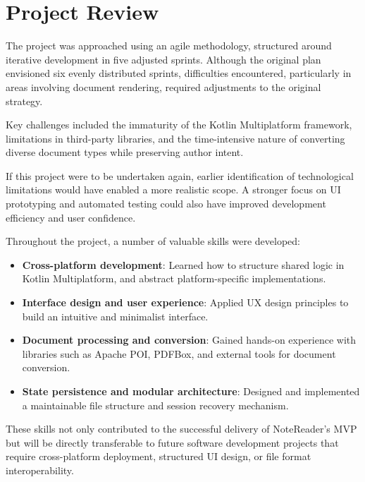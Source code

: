 \section{Project Review}

The project was approached using an agile methodology, structured around iterative development in five adjusted sprints. Although the original plan envisioned six evenly distributed sprints, difficulties encountered, particularly in areas involving document rendering, required adjustments to the original strategy.

Key challenges included the immaturity of the Kotlin Multiplatform framework, limitations in third-party libraries, and the time-intensive nature of converting diverse document types while preserving author intent. 

If this project were to be undertaken again, earlier identification of technological limitations would have enabled a more realistic scope. A stronger focus on UI prototyping and automated testing could also have improved development efficiency and user confidence.

Throughout the project, a number of valuable skills were developed:

\begin{itemize}
    \item \textbf{Cross-platform development}: Learned how to structure shared logic in Kotlin Multiplatform, and abstract platform-specific implementations.
    \item \textbf{Interface design and user experience}: Applied UX design principles to build an intuitive and minimalist interface.
    \item \textbf{Document processing and conversion}: Gained hands-on experience with libraries such as Apache POI, PDFBox, and external tools for document conversion.
    \item \textbf{State persistence and modular architecture}: Designed and implemented a maintainable file structure and session recovery mechanism.
\end{itemize}

These skills not only contributed to the successful delivery of NoteReader’s MVP but will be directly transferable to future software development projects that require cross-platform deployment, structured UI design, or file format interoperability.


